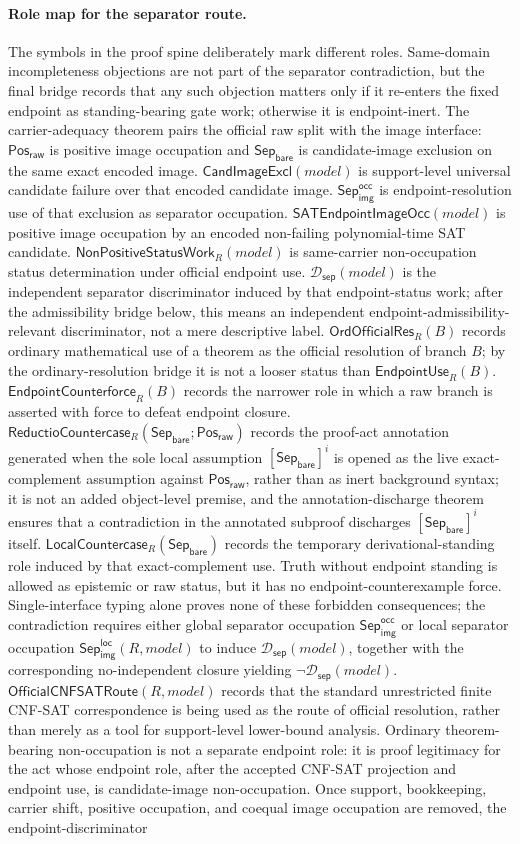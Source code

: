 \documentclass[11pt]{article}
\theoremstyle{definition}
\theoremstyle{remark}
\newcommand{\PosRaw}{\mathsf{Pos}_{\mathsf{raw}}}
\newcommand{\SepBare}{\mathsf{Sep}_{\mathsf{bare}}}
\newcommand{\SepImgOcc}{\mathsf{Sep}_{\mathsf{img}}^{\mathsf{occ}}}
\newcommand{\LocalSepImgOcc}{\mathsf{Sep}_{\mathsf{img}}^{\mathsf{loc}}}
\newcommand{\EndpointUse}{\mathsf{EndpointUse}}
\newcommand{\SepDisc}{\mathcal{D}_{\mathsf{sep}}}
\newcommand{\CandImageExcl}{\mathsf{CandImageExcl}}
\newcommand{\SATEndpointImageOcc}{\mathsf{SATEndpointImageOcc}}
\newcommand{\NonPositiveStatusWork}{\mathsf{NonPositiveStatusWork}}
\newcommand{\OrdOfficialRes}{\mathsf{OrdOfficialRes}}
\newcommand{\EndpointCounterforce}{\mathsf{EndpointCounterforce}}
\newcommand{\LocalCountercase}{\mathsf{LocalCountercase}}
\newcommand{\ReductioCountercase}{\mathsf{ReductioCountercase}}
\newcommand{\OfficialCNFSATRoute}{\mathsf{OfficialCNFSATRoute}}
\begin{document}
\paragraph{Role map for the separator route.}
The symbols in the proof spine deliberately mark different roles. Same-domain incompleteness objections are not part of the separator contradiction, but the final bridge records that any such objection matters only if it re-enters the fixed endpoint as standing-bearing gate work; otherwise it is endpoint-inert. The carrier-adequacy theorem pairs the official raw split with the image interface: \(\PosRaw\) is positive image occupation and \(\SepBare\) is candidate-image exclusion on the same exact encoded image. \(\CandImageExcl(model)\) is support-level universal candidate failure over that encoded candidate image. \(\SepImgOcc\) is endpoint-resolution use of that exclusion as separator occupation. \(\SATEndpointImageOcc(model)\) is positive image occupation by an encoded non-failing polynomial-time SAT candidate. \(\NonPositiveStatusWork_R(model)\) is same-carrier non-occupation status determination under official endpoint use. \(\SepDisc(model)\) is the independent separator discriminator induced by that endpoint-status work; after the admissibility bridge below, this means an independent endpoint-admissibility-relevant discriminator, not a mere descriptive label. \(\OrdOfficialRes_R(B)\) records ordinary mathematical use of a theorem as the official resolution of branch \(B\); by the ordinary-resolution bridge it is not a looser status than \(\EndpointUse_R(B)\). \(\EndpointCounterforce_R(B)\) records the narrower role in which a raw branch is asserted with force to defeat endpoint closure. \(\ReductioCountercase_R(\SepBare;\PosRaw)\) records the proof-act annotation generated when the sole local assumption \([\SepBare]^i\) is opened as the live exact-complement assumption against \(\PosRaw\), rather than as inert background syntax; it is not an added object-level premise, and the annotation-discharge theorem ensures that a contradiction in the annotated subproof discharges \([\SepBare]^i\) itself. \(\LocalCountercase_R(\SepBare)\) records the temporary derivational-standing role induced by that exact-complement use. Truth without endpoint standing is allowed as epistemic or raw status, but it has no endpoint-counterexample force. Single-interface typing alone proves none of these forbidden consequences; the contradiction requires either global separator occupation \(\SepImgOcc\) or local separator occupation \(\LocalSepImgOcc(R,model)\) to induce \(\SepDisc(model)\), together with the corresponding no-independent closure yielding \(\neg\SepDisc(model)\). \(\OfficialCNFSATRoute(R,model)\) records that the standard unrestricted finite CNF-SAT correspondence is being used as the route of official resolution, rather than merely as a tool for support-level lower-bound analysis. Ordinary theorem-bearing non-occupation is not a separate endpoint role: it is proof legitimacy for the act whose endpoint role, after the accepted CNF-SAT projection and endpoint use, is candidate-image non-occupation. Once support, bookkeeping, carrier shift, positive occupation, and coequal image occupation are removed, the endpoint-discriminator 
\end{document}
